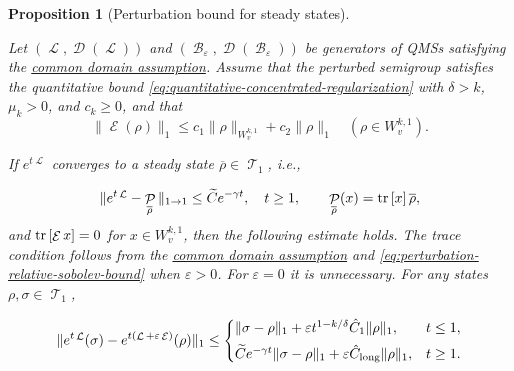 \documentclass[11pt]{article}
\theoremstyle{myplain}
\newtheorem{prop}[prop]{Proposition}
\theoremstyle{mydefinition}
\theoremstyle{remark}
\DeclareMathOperator{\cB}{\mathcal{B}}
\DeclareMathOperator{\cD}{\mathcal{D}}
\DeclareMathOperator{\cE}{\mathcal{E}}
\DeclareMathOperator{\cL}{\mathcal{L}}
\DeclareMathOperator{\cP}{\mathcal{P}}
\DeclareMathOperator{\cT}{\mathcal{T}}
\DeclareMathOperator{\1}{\mathds{1}}
\newcommand{\tr}[1][]{\operatorname{tr}%
  \ifx#1\empty \else \left[ #1 \right] \fi}
\begin{document}
        \begin{prop}[Perturbation bound for steady states]\label{prop:steady-state-perturbation-bound}
            
            Let $(\cL,\cD(\cL))$ and $(\cB_\varepsilon,\cD(\cB_\varepsilon))$ be generators of QMSs satisfying the \hyperref[assum:perturbation-common-domain]{common domain assumption}. Assume that the perturbed semigroup satisfies the quantitative bound \eqref{eq:quantitative-concentrated-regularization} with $\delta>k$, $\mu_k>0$, and $c_k\geq0$, and that
            \begin{equation}\label{eq:perturbation-relative-sobolev-bound}
                \|\cE(\rho)\|_1\leq c_1\|\rho\|_{W_v^{k,1}}+c_2\|\rho\|_1
                \quad(\rho\in W_v^{k,1}).
            \end{equation}
            
            If $e^{t\cL}$ converges to a steady state $\overline{\rho}\in\cT_1$, i.e.,
            
            \begin{equation}\label{eq:uniform-asymptotic-channel-mixing}
                \|e^{t\cL}-\cP_{\overline\rho}\|_{1\to1}\leq\widetilde C e^{-\gamma t},
                \quad t\geq1,\qquad \cP_{\overline\rho}(x)=\tr[x]\overline\rho,
            \end{equation}
            and $\tr[\cE x]=0$ for $x\in W_v^{k,1}$, then the following estimate holds. The trace condition follows from the \hyperref[assum:perturbation-common-domain]{common domain assumption} and \eqref{eq:perturbation-relative-sobolev-bound} when $\varepsilon>0$. For $\varepsilon=0$ it is unnecessary. For any states $\rho,\sigma\in\cT_1$,
            
            \begin{equation*}
                \begin{aligned}
                    \|e^{t\cL}(\sigma)-e^{t(\cL+\varepsilon\cE)}(\rho)\|_1
                    \leq
                    \begin{cases}
                        \|\sigma-\rho\|_1+\varepsilon t^{1-k/\delta}\hat C_1\|\rho\|_1,&t\leq1,\\[4pt]
                        \widetilde C e^{-\gamma t}\|\sigma-\rho\|_1+
                        \varepsilon\hat C_{\rm long}\|\rho\|_1,&t\geq1.
                    \end{cases}
                \end{aligned}
            \end{equation*}
            

\end{prop}
\end{document}
